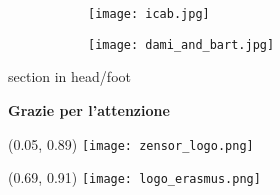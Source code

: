 \begin{frame}[plain]
    \vspace*{\fill}
    \begin{minipage}[c][0.63\paperheight]{\textwidth}
        \begin{figure}[ht]
            \begin{subfigure}{.495\textwidth}
                \centering
                \texttt{[image: icab.jpg]}
            \end{subfigure}
            \begin{subfigure}{.495\textwidth}
                \centering
                \texttt{[image: dami\_and\_bart.jpg]}
            \end{subfigure}
        \end{figure}
    \end{minipage}

    \begin{beamercolorbox}[wd        = \paperwidth,
            leftskip  = 1 em,
            rightskip = 1 em]
        {section in head/foot}

        \begin{minipage}[c][0.2\paperheight]{\textwidth}
            \centering \bfseries{\LARGE Grazie per l'attenzione}

        \end{minipage}
    \end{beamercolorbox}

    \begin{minipage}[c][0.1\paperheight]{\textwidth}
    \end{minipage}

    \begin{textblock}{1}(0.05, 0.89)
        \texttt{[image: zensor\_logo.png]}
    \end{textblock}

    \begin{textblock}{1}(0.69, 0.91)
        \texttt{[image: logo\_erasmus.png]}
    \end{textblock}

    \vspace*{\fill}
\end{frame}